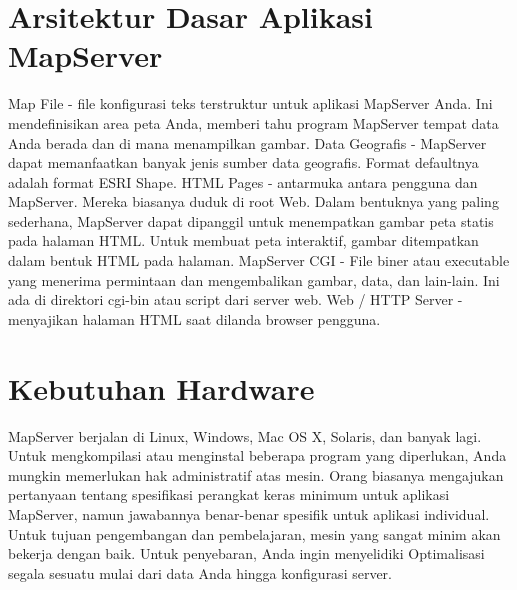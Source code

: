 \section{Arsitektur Dasar Aplikasi MapServer}
Map File - file konfigurasi teks terstruktur untuk aplikasi MapServer Anda. Ini mendefinisikan area peta Anda, memberi tahu program MapServer tempat data Anda berada dan di mana menampilkan gambar.
Data Geografis - MapServer dapat memanfaatkan banyak jenis sumber data geografis. Format defaultnya adalah format ESRI Shape.
HTML Pages - antarmuka antara pengguna dan MapServer. Mereka biasanya duduk di root Web. Dalam bentuknya yang paling sederhana, MapServer dapat dipanggil untuk menempatkan gambar peta statis pada halaman HTML. Untuk membuat peta interaktif, gambar ditempatkan dalam bentuk HTML pada halaman.
MapServer CGI - File biner atau executable yang menerima permintaan dan mengembalikan gambar, data, dan lain-lain. Ini ada di direktori cgi-bin atau script dari server web.
Web / HTTP Server - menyajikan halaman HTML saat dilanda browser pengguna.

\section{Kebutuhan Hardware}
MapServer berjalan di Linux, Windows, Mac OS X, Solaris, dan banyak lagi. Untuk mengkompilasi atau menginstal beberapa program yang diperlukan, Anda mungkin memerlukan hak administratif atas mesin. Orang biasanya mengajukan pertanyaan tentang spesifikasi perangkat keras minimum untuk aplikasi MapServer, namun jawabannya benar-benar spesifik untuk aplikasi individual. Untuk tujuan pengembangan dan pembelajaran, mesin yang sangat minim akan bekerja dengan baik. Untuk penyebaran, Anda ingin menyelidiki Optimalisasi segala sesuatu mulai dari data Anda hingga konfigurasi server.

